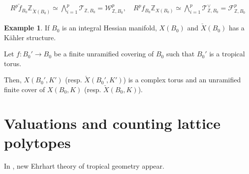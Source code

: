 \documentclass[a4paper,dvipdfmx,reqno,12pt]{amsart}
\theoremstyle{definition}
\newtheorem{example}[theorem]{Example}
\newcommand{\Z}{\mathbb{Z}}%
\newcommand{\mcal}[1]{\mathcal{#1}}%
\newcommand{\TBZ}{\mcal{T}_{\Z,B_0}}
\numberwithin{equation}{section}
\begin{document}
\begin{align}
  R^{p}\check{f}_{B_0}\Z_{\check{X}(B_0)}\simeq \bigwedge_{i=1}^{p} \TBZ=\mcal{W}^{p}_{\Z,B_0}, \quad R^{p}f_{B_0}\Z_{X(B_0)}\simeq \bigwedge_{i=1}^{p} \TBZ^{\vee}=\mcal{F}_{\Z,B_0}^{p}
\end{align}



\begin{example}
If $B_0$ is an integral Hessian manifold, 
$X(B_0)$ and $\check{X}(B_0)$ has a K\"ahler structure.

Let $f:B_0' \to B_0$ be a finite unramified covering of $B_0$ such that $B_0'$ is a tropical torus.

Then, $X(B_0',K')$ (resp. $\check{X}(B_0',K')$) 
is a complex torus and an unramified finite cover 
of $X(B_0,K)$ (resp. $\check{X}(B_0,K)$).

\end{example}

\section{Valuations and counting lattice polytopes}

In \cite{MR4155409},
new Ehrhart theory of tropical geometry appear.




\printindex
\end{document}
